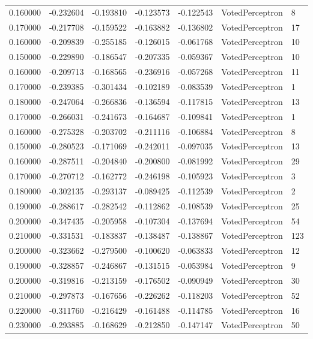 \begin{tabular}{rrrrrll}
0.160000 & -0.232604 & -0.193810 & -0.123573 & -0.122543 & VotedPerceptron & 8 \\
0.170000 & -0.217708 & -0.159522 & -0.163882 & -0.136802 & VotedPerceptron & 17 \\
0.160000 & -0.209839 & -0.255185 & -0.126015 & -0.061768 & VotedPerceptron & 10 \\
0.150000 & -0.229890 & -0.186547 & -0.207335 & -0.059367 & VotedPerceptron & 10 \\
0.160000 & -0.209713 & -0.168565 & -0.236916 & -0.057268 & VotedPerceptron & 11 \\
0.170000 & -0.239385 & -0.301434 & -0.102189 & -0.083539 & VotedPerceptron & 1 \\
0.180000 & -0.247064 & -0.266836 & -0.136594 & -0.117815 & VotedPerceptron & 13 \\
0.170000 & -0.266031 & -0.241673 & -0.164687 & -0.109841 & VotedPerceptron & 1 \\
0.160000 & -0.275328 & -0.203702 & -0.211116 & -0.106884 & VotedPerceptron & 8 \\
0.150000 & -0.280523 & -0.171069 & -0.242011 & -0.097035 & VotedPerceptron & 13 \\
0.160000 & -0.287511 & -0.204840 & -0.200800 & -0.081992 & VotedPerceptron & 29 \\
0.170000 & -0.270712 & -0.162772 & -0.246198 & -0.105923 & VotedPerceptron & 3 \\
0.180000 & -0.302135 & -0.293137 & -0.089425 & -0.112539 & VotedPerceptron & 2 \\
0.190000 & -0.288617 & -0.282542 & -0.112862 & -0.108539 & VotedPerceptron & 25 \\
0.200000 & -0.347435 & -0.205958 & -0.107304 & -0.137694 & VotedPerceptron & 54 \\
0.210000 & -0.331531 & -0.183837 & -0.138487 & -0.138867 & VotedPerceptron & 123 \\
0.200000 & -0.323662 & -0.279500 & -0.100620 & -0.063833 & VotedPerceptron & 12 \\
0.190000 & -0.328857 & -0.246867 & -0.131515 & -0.053984 & VotedPerceptron & 9 \\
0.200000 & -0.319816 & -0.213159 & -0.176502 & -0.090949 & VotedPerceptron & 30 \\
0.210000 & -0.297873 & -0.167656 & -0.226262 & -0.118203 & VotedPerceptron & 52 \\
0.220000 & -0.311760 & -0.216429 & -0.161488 & -0.114785 & VotedPerceptron & 16 \\
0.230000 & -0.293885 & -0.168629 & -0.212850 & -0.147147 & VotedPerceptron & 50 \\

\end{tabular}
